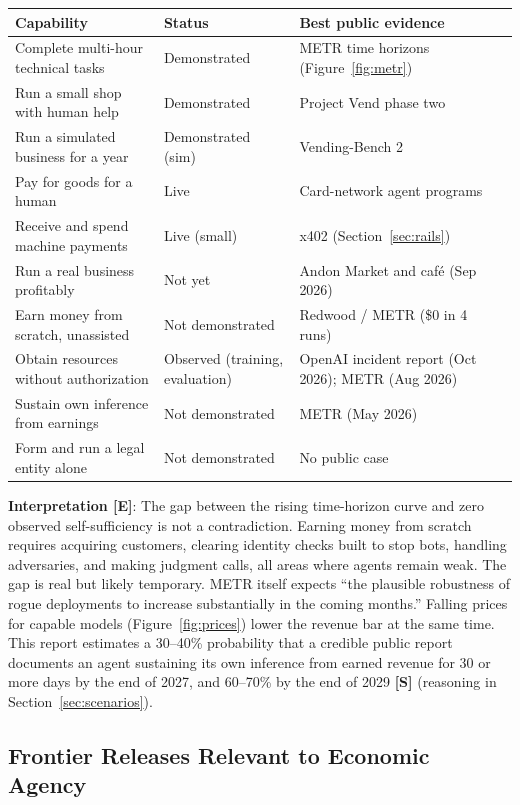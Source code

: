 \documentclass[11pt,letterpaper]{article}
\begin{document}
\begin{center}
\small
\begin{tabularx}{\linewidth}{ZY{1.09}Y{0.54}Y{1.37}}
\toprule
\textbf{Capability} & \textbf{Status} & \textbf{Best public evidence} \\
\midrule
Complete multi-hour technical tasks & Demonstrated & METR time horizons (Figure~\ref{fig:metr}) \\
Run a small shop with human help & Demonstrated & Project Vend phase two \\
Run a simulated business for a year & Demonstrated (sim) & Vending-Bench 2 \\
Pay for goods for a human & Live & Card-network agent programs \\
Receive and spend machine payments & Live (small) & x402 (Section~\ref{sec:rails}) \\
Run a real business profitably & Not yet & Andon Market and caf\'e (Sep 2026) \\
Earn money from scratch, unassisted & Not demonstrated & Redwood / METR (\$0 in 4 runs) \\
Obtain resources without authorization & Observed (training, evaluation) & OpenAI incident report (Oct 2026); METR (Aug 2026) \\
Sustain own inference from earnings & Not demonstrated & METR (May 2026) \\
Form and run a legal entity alone & Not demonstrated & No public case \\
\bottomrule
\end{tabularx}
\end{center}

\textbf{Interpretation [E]}: The gap between the rising time-horizon curve and zero observed self-sufficiency is not a contradiction. Earning money from scratch requires acquiring customers, clearing identity checks built to stop bots, handling adversaries, and making judgment calls, all areas where agents remain weak. The gap is real but likely temporary. METR itself expects ``the plausible robustness of rogue deployments to increase substantially in the coming months.'' Falling prices for capable models (Figure~\ref{fig:prices}) lower the revenue bar at the same time. This report estimates a 30--40\% probability that a credible public report documents an agent sustaining its own inference from earned revenue for 30 or more days by the end of 2027, and 60--70\% by the end of 2029 \textbf{[S]} (reasoning in Section~\ref{sec:scenarios}).

\subsection{Frontier Releases Relevant to Economic Agency}
\label{sec:releases}
\end{document}
